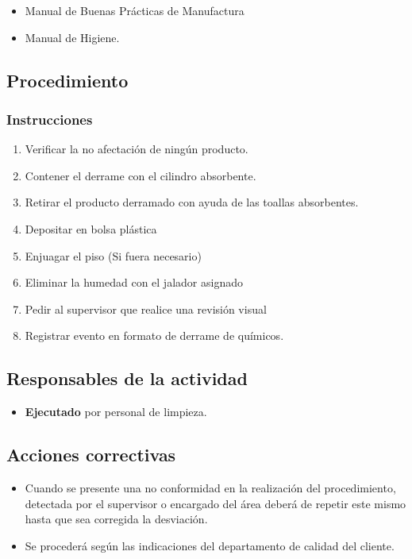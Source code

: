 \begin{itemize}
	\item Manual de Buenas Prácticas de Manufactura
	\item Manual de Higiene.
\end{itemize}

\subsection{Procedimiento}

\subsubsection{Instrucciones}

\begin{enumerate}
	\item Verificar la no afectación de ningún producto.
	\item Contener el derrame con el cilindro absorbente.
	\item Retirar el producto derramado con ayuda de las toallas absorbentes.
	\item Depositar en bolsa plástica
	\item Enjuagar el piso (Si fuera necesario)
	\item Eliminar la humedad con el jalador asignado
	\item Pedir al supervisor que realice una revisión visual
	\item Registrar evento en formato de derrame de químicos.
\end{enumerate}

\subsection{Responsables de la actividad}

\begin{itemize}
	\item \textbf{Ejecutado} por personal de limpieza.
\end{itemize}

\subsection{Acciones correctivas}

\begin{itemize}
	\item Cuando se presente una no conformidad en la realización del procedimiento, detectada por el supervisor o encargado del área deberá de repetir este mismo hasta que sea corregida la desviación.
	\item Se procederá según las indicaciones del departamento de calidad del cliente.
\end{itemize}


